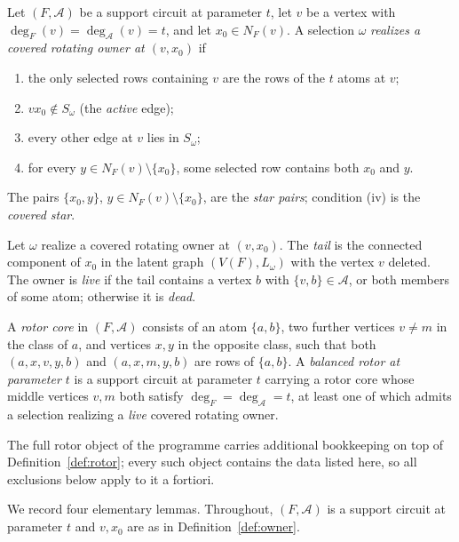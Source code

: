 \begin{definition}\label{def:owner}
Let \((F,\mathcal A)\) be a support circuit at parameter \(t\), let
\(v\) be a vertex with
\(\deg_F(v)=\deg_{\mathcal A}(v)=t\), and let \(x_0\in N_F(v)\). A
selection \(\omega\) \emph{realizes a covered rotating owner at
\((v,x_0)\)} if
\begin{enumerate}[label=\textup{(\roman*)}]
\item the only selected rows containing \(v\) are the rows of the
\(t\) atoms at \(v\);
\item \(vx_0\notin S_\omega\) (the \emph{active} edge);
\item every other edge at \(v\) lies in \(S_\omega\);
\item for every \(y\in N_F(v)\setminus\{x_0\}\), some selected row
contains both \(x_0\) and \(y\).
\end{enumerate}
The pairs \(\{x_0,y\}\), \(y\in N_F(v)\setminus\{x_0\}\), are the
\emph{star pairs}; condition (iv) is the \emph{covered star}.
\end{definition}

\begin{definition}\label{def:live}
Let \(\omega\) realize a covered rotating owner at \((v,x_0)\). The
\emph{tail} is the connected component of \(x_0\) in the latent graph
\((V(F),L_\omega)\) with the vertex \(v\) deleted. The owner is
\emph{live} if the tail contains a vertex \(b\) with
\(\{v,b\}\in\mathcal A\), or both members of some atom; otherwise it
is \emph{dead}.
\end{definition}

\begin{definition}\label{def:rotor}
A \emph{rotor core} in \((F,\mathcal A)\) consists of an atom
\(\{a,b\}\), two further vertices \(v\neq m\) in the class of \(a\),
and vertices \(x,y\) in the opposite class, such that both
\((a,x,v,y,b)\) and \((a,x,m,y,b)\) are rows of \(\{a,b\}\). A
\emph{balanced rotor at parameter \(t\)} is a support circuit at
parameter \(t\) carrying a rotor core whose middle vertices \(v,m\)
both satisfy \(\deg_F=\deg_{\mathcal A}=t\), at least one of which
admits a selection realizing a \emph{live} covered rotating owner.
\end{definition}

The full rotor object of the programme carries additional bookkeeping
on top of Definition~\ref{def:rotor}; every such object contains the
data listed here, so all exclusions below apply to it a fortiori.

We record four elementary lemmas. Throughout,
\((F,\mathcal A)\) is a support circuit at parameter \(t\) and
\(v,x_0\) are as in Definition~\ref{def:owner}.

